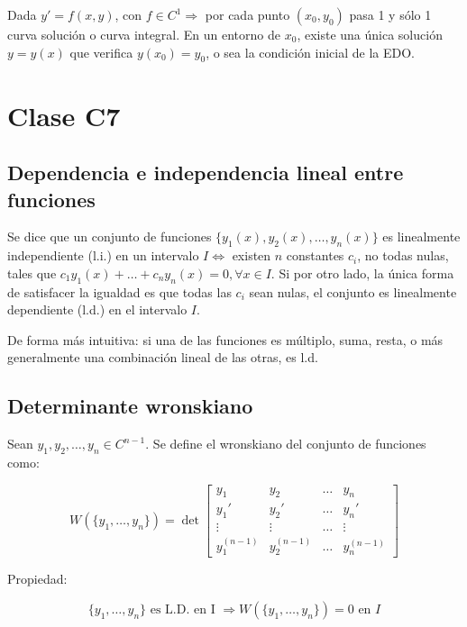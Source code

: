 \documentclass{article}
\begin{document}
Dada $y' = f(x,y)$, con $f \in C^1 \Rightarrow$ por cada punto $(x_0, y_0)$ pasa 1 y sólo 1 curva solución o curva integral. En un entorno de $x_0$, existe una única solución $y = y(x)$ que verifica $y(x_0) = y_0$, o sea la condición inicial de la EDO.

\section{Clase C7}

\subsection{Dependencia e independencia lineal entre funciones}

Se dice que un conjunto de funciones $\{y_1(x), y_2(x), \ldots, y_n(x) \}$ es linealmente independiente (l.i.) en un intervalo $I \Leftrightarrow$ existen $n$ constantes $c_i$, no todas nulas, tales que $c_1 y_1(x) + \ldots + c_n y_n(x) = 0, \forall x \in I$. Si por otro lado, la única forma de satisfacer la igualdad es que todas las $c_i$ sean nulas, el conjunto es linealmente dependiente (l.d.) en el intervalo $I$.

De forma más intuitiva: si una de las funciones es múltiplo, suma, resta, o más generalmente una combinación lineal de las otras, es l.d.

\subsection{Determinante wronskiano}

Sean $y_1, y_2, \ldots, y_n \in C^{n-1}$. Se define el wronskiano del conjunto de funciones como:

\begin{equation}
W(\{y_1, \ldots, y_n\}) = \det
\begin{bmatrix}
y_1 & y_2 & \ldots & y_n \\
y_1' & y_2' & \ldots & y_n' \\
\vdots & \vdots & \ldots & \vdots \\
y_1^{(n-1)} & y_2^{(n-1)} & \ldots & y_n^{(n-1)}
\end{bmatrix}
\end{equation}

Propiedad:

\begin{equation}
\{y_1, \ldots, y_n\} \text{ es L.D. en I } \Rightarrow W(\{y_1, \ldots, y_n\}) = 0 \text{ en } I 
\end{equation}
\end{document}
